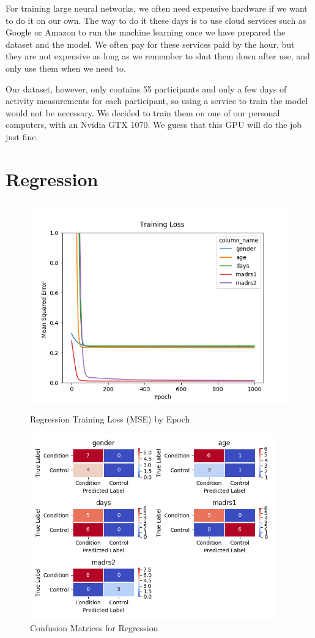 For training large neural networks, we often need expensive hardware if we want to do it on our own. The way to do it these days is to use cloud services such as Google or Amazon to run the machine learning once we have prepared the dataset and the model. We often pay for these services paid by the hour, but they are not expensive as long as we remember to shut them down after use, and only use them when we need to.

Our dataset, however, only contains 55 participants and only a few days of activity measurements for each participant, so using a service to train the model would not be necessary. We decided to train them on one of our personal computers, with an Nvidia GTX 1070. We guess that this GPU will do the job just fine. 
 
\section{Regression}

\begin{figure}
      \includegraphics[height=9cm]{img/regression/results_kerasregressor_1k_epochs.png}
      \caption{Regression Training Loss (MSE) by Epoch}
      \label{figure:regression_training_loss}
\end{figure}

\begin{figure}
      \includegraphics[height=8cm]{img/regression/confusion_kerasregressor_grouped.png}
      \caption{Confusion Matrices for Regression}
      \label{figure:regression_test_confusion}
\end{figure}

